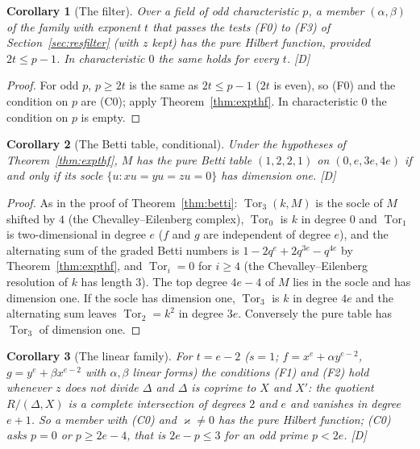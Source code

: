 \documentclass[11pt]{article}
\newtheorem{corollary}{Corollary}
\theoremstyle{definition}
\theoremstyle{remark}
\newcommand{\Tor}{\operatorname{Tor}}
\begin{document}
\begin{corollary}[The filter]\label{cor:exptfilter}
Over a field of odd characteristic $p$, a member $(\alpha,\beta)$ of the family with exponent $t$ that passes the tests (F0) to (F3) of Section~\ref{sec:resfilter} (with $z$ kept) has the pure Hilbert function, provided $2t\le p-1$. In characteristic $0$ the same holds for every $t$. [D]
\end{corollary}
\begin{proof}
For odd $p$, $p\ge2t$ is the same as $2t\le p-1$ ($2t$ is even), so (F0) and the condition on $p$ are (C0); apply Theorem~\ref{thm:expthf}. In characteristic $0$ the condition on $p$ is empty.
\end{proof}

\begin{corollary}[The Betti table, conditional]\label{cor:exptsocle}
Under the hypotheses of Theorem~\ref{thm:expthf}, $M$ has the pure Betti table $(1,2,2,1)$ on $(0,e,3e,4e)$ if and only if its socle $\{u:xu=yu=zu=0\}$ has dimension one. [D]
\end{corollary}
\begin{proof}
As in the proof of Theorem~\ref{thm:betti}: $\Tor_3(k,M)$ is the socle of $M$ shifted by $4$ (the Chevalley--Eilenberg complex), $\Tor_0$ is $k$ in degree $0$ and $\Tor_1$ is two-dimensional in degree $e$ ($f$ and $g$ are independent of degree $e$), and the alternating sum of the graded Betti numbers is $1-2q^e+2q^{3e}-q^{4e}$ by Theorem~\ref{thm:expthf}, and $\Tor_i=0$ for $i\ge4$ (the Chevalley--Eilenberg resolution of $k$ has length $3$). The top degree $4e-4$ of $M$ lies in the socle and has dimension one. If the socle has dimension one, $\Tor_3$ is $k$ in degree $4e$ and the alternating sum leaves $\Tor_2=k^2$ in degree $3e$. Conversely the pure table has $\Tor_3$ of dimension one.
\end{proof}

\begin{corollary}[The linear family]\label{cor:exptlinear}
For $t=e-2$ ($s=1$; $f=x^e+\alpha y^{e-2}$, $g=y^e+\beta x^{e-2}$ with $\alpha,\beta$ linear forms) the conditions (F1) and (F2) hold whenever $z$ does not divide $\Delta$ and $\Delta$ is coprime to $X$ and $X'$: the quotient $R/(\Delta,X)$ is a complete intersection of degrees $2$ and $e$ and vanishes in degree $e+1$. So a member with (C0) and $\varkappa\ne0$ has the pure Hilbert function; (C0) asks $p=0$ or $p\ge2e-4$, that is $2e-p\le3$ for an odd prime $p<2e$. [D]
\end{corollary}
\end{document}

